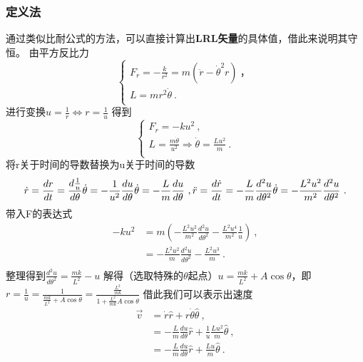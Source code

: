 \subsubsection{定义法}
通过类似比耐公式的方法，可以直接计算出\textbf{LRL矢量}的具体值，借此来说明其守恒。
由平方反比力
\begin{equation}
\begin{cases}
F_{r}=-\frac{k}{r^{2}} = m\left(\ddot r -\dot \theta ^{2}r\right)~，\\
L = mr^{2}\dot \theta ~.\\
\end{cases}
\end{equation}
进行变换$u = \frac{1}{r} \Longleftrightarrow r = \frac{1}{u}$
得到
\begin{equation}
\begin{cases}
F_{r}= -ku^{2} ~,\\
L = \frac{m\dot \theta}{u^{2}}\Rightarrow \dot \theta = \frac{Lu^2}{m} ~.\\
\end{cases}
\end{equation}
将r关于时间的导数替换为u关于时间的导数
\begin{equation}
\dot r = \frac{dr}{dt}= \frac{d \frac{1}{u}}{d\theta}\dot \theta =-\frac{1}{u^{2} } \frac{du}{d\theta} \dot \theta = -\frac{L}{m}\frac{du}{d\theta}~,\\
\ddot r = \frac{d \dot r}{d t} =-\frac{L}{m} \frac{d^{2}u}{d \theta^{2}} \dot \theta = -\frac{L^{2}u^{2}}{m^{2}}\frac{d^{2}u}{d \theta^{2}}~.\\
\end{equation}
带入F的表达式
\begin{align}
-ku^{2}
&=m\left(-\frac{L^{2}u^{2}}{m^{2}}\frac{d^{2}u}{d \theta^{2}}-\frac{L^{2}u^{4}}{m^{2}}\frac{1}{u}\right)~,\\
&= -\frac{L^{2}u^{2}}{m}\frac{d^{2}u}{d \theta^{2}}-\frac{L^{2}u^{3}}{m}~.\\
\end{align}
整理得到$\frac{d^{2}u}{d\theta^{2}} = \frac{mk}{L^{2}}-u$
解得（选取特殊的$\theta$起点）$u = \frac{mk}{L^{2}} + A \cos \theta$，即$r = \frac{1}{u} = \frac{1}{\frac{mk}{L^{2}} + A \cos \theta} = \frac{\frac{L^2}{mk}}{1 + \frac{L^2}{mk} A \cos \theta}$
借此我们可以表示出速度
\begin{align}
\vec v &= \dot r \hat r + r \dot \theta \hat \theta ~,\\
&=-\frac{L}{m}\frac{du}{d\theta} \hat r + \frac{1}{u} \frac{Lu^{2}}{m} \hat \theta ~,\\
&=-\frac{L}{m}\frac{du}{d\theta} \hat r +  \frac{Lu}{m} \hat \theta ~.\\
\end{align}
